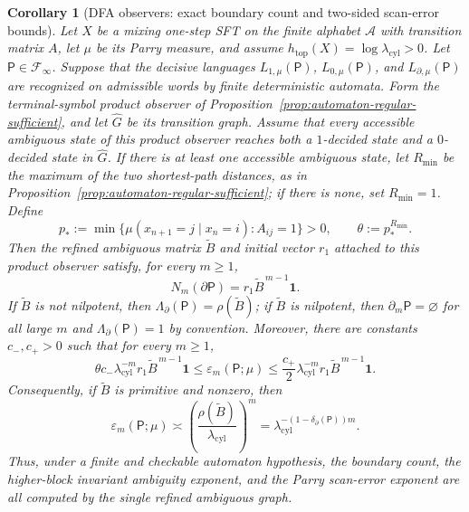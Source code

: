 \documentclass{etds}%
\numberwithin{equation}{section}
\theoremstyle{plain}
\newtheorem{corollary}[theorem]{Corollary}
\theoremstyle{definition}
\theoremstyle{remark}
\begin{document}
\begin{corollary}[DFA observers: exact boundary count and two-sided scan-error bounds]
\label{cor:dfa-observer-parry-law}
Let $X$ be a mixing one-step SFT on the finite alphabet $\mathcal{A}$ with
transition matrix $A$, let $\mu$ be its Parry measure, and assume
$h_{\mathrm{top}}(X)=\log\lambda_{\mathrm{cyl}}>0$.  Let
$\mathsf{P}\in\mathcal{F}_\infty$.  Suppose that the decisive languages
$L_{1,\mu}(\mathsf{P})$, $L_{0,\mu}(\mathsf{P})$, and
$L_{\partial,\mu}(\mathsf{P})$ are recognized on admissible words by finite
deterministic automata.  Form the terminal-symbol product observer of
Proposition~\ref{prop:automaton-regular-sufficient}, and let
$\widehat G$ be its transition graph.  Assume that every accessible ambiguous
state of this product observer reaches both a $1$-decided state and a
$0$-decided state in $\widehat G$.  If there is at least one accessible
ambiguous state, let $R_{\min}$ be the maximum of the two shortest-path
distances, as in Proposition~\ref{prop:automaton-regular-sufficient}; if there is
none, set $R_{\min}=1$.  Define
\[
  p_*:=\min\{\mu(x_{n+1}=j\mid x_n=i): A_{ij}=1\}>0,
  \qquad
  \theta:=p_*^{R_{\min}} .
\]
Then the refined ambiguous matrix $\widetilde B$ and initial vector $r_1$
attached to this product observer satisfy, for every $m\ge1$,
\[
N_m(\partial\mathsf{P})=r_1\widetilde B^{\,m-1}\mathbf 1.
\]
If $\widetilde B$ is not nilpotent, then
$\Lambda_\partial(\mathsf{P})=\rho(\widetilde B)$; if $\widetilde B$ is
nilpotent, then $\partial_m\mathsf{P}=\varnothing$ for all large $m$ and
$\Lambda_\partial(\mathsf{P})=1$ by convention.  Moreover, there are constants
$c_-,c_+>0$ such that for every $m\ge1$,
\[
\theta c_-\lambda_{\mathrm{cyl}}^{-m}
r_1\widetilde B^{\,m-1}\mathbf 1
\le \varepsilon_m(\mathsf{P};\mu)
\le
\frac{c_+}{2}\lambda_{\mathrm{cyl}}^{-m}
r_1\widetilde B^{\,m-1}\mathbf 1 .
\]
Consequently, if $\widetilde B$ is primitive and nonzero, then
\[
\varepsilon_m(\mathsf{P};\mu)\asymp
\left(\frac{\rho(\widetilde B)}{\lambda_{\mathrm{cyl}}}\right)^m
=\lambda_{\mathrm{cyl}}^{-(1-\delta_\partial(\mathsf{P}))m}.
\]
Thus, under a finite and checkable automaton hypothesis, the boundary count,
the higher-block invariant ambiguity exponent, and the Parry scan-error
exponent are all computed by the single refined ambiguous graph.
\end{corollary}
\end{document}
